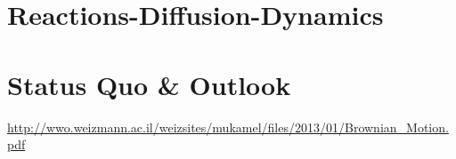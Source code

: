 \documentclass[
  a4paper,BCOR10mm,oneside,
  bibtotoc,idxtotoc,
  headsepline,footsepline,%
  fleqn,openbib
]{scrbook}
\begin{document}
\chapter{Reactions-Diffusion-Dynamics}
\chapter{Status Quo \& Outlook}
%

\nocite{}



\url{http://wwo.weizmann.ac.il/weizsites/mukamel/files/2013/01/Brownian_Motion.pdf}
\end{document}
